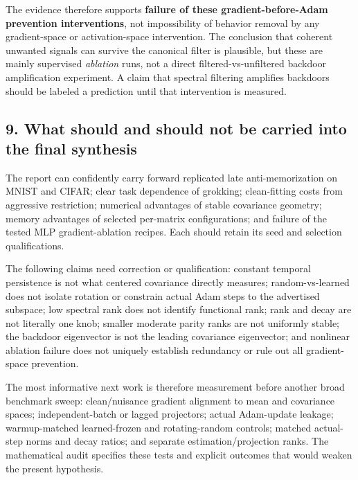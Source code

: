 \documentclass[
  british,
  10pt,
  a4paper,
]{article}
\begin{document}
The evidence therefore supports \textbf{failure of these
gradient-\allowbreak{}before-\allowbreak{}Adam prevention
interventions}, not impossibility of behavior removal by any
gradient-\allowbreak{}space or activation-\allowbreak{}space
intervention\allowbreak{}.\allowbreak{} The conclusion that coherent
unwanted signals can survive the canonical filter is plausible, but
these are mainly supervised \emph{ablation} runs, not a direct
filtered-\allowbreak{}vs-\allowbreak{}unfiltered backdoor amplification
experiment.\allowbreak{} A claim that spectral filtering amplifies
backdoors should be labeled a prediction until that intervention is
measured.

\subsection{9. What should and should not be carried into the final
synthesis}\label{classical-evidence--what-should-and-should-not-be-carried-into-the-final-synthesis}

The report can confidently carry forward replicated late
anti-\allowbreak{}memorization\allowbreak{} on MNIST and CIFAR; clear
task dependence of grokking; clean-\allowbreak{}fitting costs from
aggressive restriction; numerical advantages of stable covariance
geometry; memory advantages of selected per-matrix configurations; and
failure of the tested MLP gradient-\allowbreak{}ablation recipes. Each
should retain its seed and selection
qualificatio\allowbreak{}ns.\allowbreak{}

The following claims need correction or qualification: constant temporal
persistence is not what centered covariance directly measures;
random-\allowbreak{}vs-\allowbreak{}learned does not isolate rotation or
constrain actual Adam steps to the advertised subspace; low spectral
rank does not identify functional rank; rank and decay are not literally
one knob; smaller moderate parity ranks are not uniformly stable; the
backdoor eigenvector is not the leading covariance eigenvector; and
nonlinear ablation failure does not uniquely establish redundancy or
rule out all gradient-\allowbreak{}space prevention.\allowbreak{}

The most informative next work is therefore measurement before another
broad benchmark sweep: clean/\allowbreak{}nuisance gradient alignment to
mean and covariance spaces; independent-\allowbreak{}batch or lagged
projectors; actual Adam-\allowbreak{}update leakage;
warmup-\allowbreak{}matched learned-\allowbreak{}frozen and
rotating-\allowbreak{}random controls; matched actual-\allowbreak{}step
norms and decay ratios; and separate estimation/\allowbreak{}projection
ranks. The mathematical audit specifies these tests and explicit
outcomes that would weaken the present hypothesis.\allowbreak{}
\end{document}
